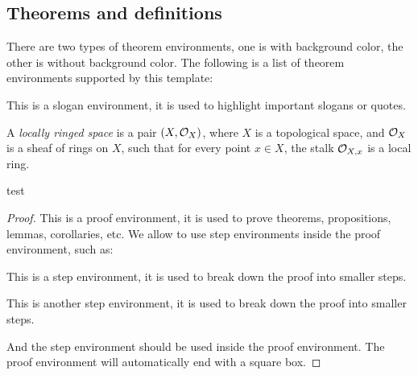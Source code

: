 \subsection{Theorems and definitions}\label{subsec:theorems_and_definitions}
    
    There are two types of theorem environments, one is with background color, the other is without background color. 
    The following is a list of theorem environments supported by this template:
    
    \begin{slogan}
        This is a slogan environment, it is used to highlight important slogans or quotes.
    \end{slogan}

    \begin{definition}
        A \emph{locally ringed space} is a pair \((X, {\mathcal{O}}_X)\), where \(X\) is a topological space, and \({\mathcal{O}}_X\) is a sheaf of rings on \(X\), such that for every point \(x \in X\), the stalk \({\mathcal{O}}_{X,x}\) is a local ring.
    \end{definition}
    \begin{proposition}
        test 
    \end{proposition}
    \begin{proof}
        This is a proof environment, it is used to prove theorems, propositions, lemmas, corollaries, etc.
        We allow to use step environments inside the proof environment, such as:
        \begin{step}\label{step:1_in_proof_1}
            This is a step environment, it is used to break down the proof into smaller steps.
        \end{step}
        \begin{step}\label{step:2_in_proof_1}
            This is another step environment, it is used to break down the proof into smaller steps.
        \end{step}
        And the step environment should be used inside the proof environment.
        The proof environment will automatically end with a square box.
    \end{proof}
    
